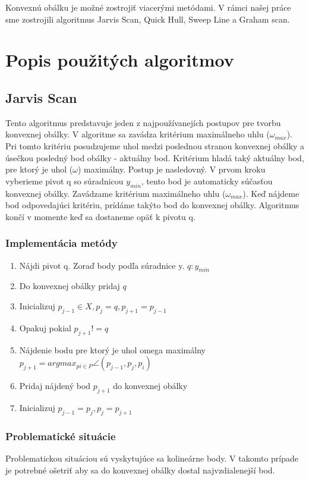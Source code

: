\documentclass[12pt]{article}
\begin{document}
Konvexnú obálku je možné zostrojiť viacerými metódami. V rámci našej práce sme zostrojili algoritmus Jarvis Scan, Quick Hull, Sweep Line a Graham scan.

\clearpage 
\section {Popis použitých algoritmov}
\subsection {Jarvis Scan}
Tento algoritmus predstavuje jeden z najpoužívanejích postupov pre tvorbu konvexnej obálky. V algoritme sa zavádza kritérium maximálneho uhlu ($\omega_{max}$). Pri tomto kritériu posudzujeme uhol medzi poslednou stranou konvexnej obálky a úsečkou posledný bod obálky - aktuálny bod. Kritérium hladá taký aktuálny bod, pre ktorý je uhol ($\omega$) maximálny. 
Postup je nasledovný. V prvom kroku vyberieme pivot q so súradnicou $y_{min}$, tento bod je automaticky súčasťou konvexnej obálky. Zavádzame kritérium maximálneho uhlu ($\omega_{max}$). Keď nájdeme bod odpovedajúci kritériu, prídáme takýto bod do konvexnej obálky. Algoritmus končí v momente keď sa dostaneme opäť k pivotu q. 

\subsubsection {Implementácia metódy}
\begin{enumerate}
\item Nájdi pivot q. Zoraď body podľa súradnice y. $ q : y_{min}$
\item Do konvexnej obálky pridaj $q$
\item Inicializuj  $p_{j-1} \in X, p_j = q, p_{j+1} = p_{j-1}$
\item Opakuj pokial $p_{j+1} != q$
\item \hspace {1.5cm} Nájdenie bodu pre ktorý je uhol omega maximálny $p_{j+1} = argmax_{pi \in P} \angle(p_{j-1}, p_j, p_i)$
\item \hspace {1.5cm} Pridaj nájdený bod  $p_{j+1}$ do konvexnej obálky
\item \hspace {1.5cm} Inicializuj $p_{j-1} = p_j , p_j = p_{j+1}$ 
\end{enumerate}

\subsubsection {Problematické situácie}
Problematickou situáciou sú vyskytujúce sa kolineárne body. V takomto prípade je potrebné ošetriť aby sa do konvexnej obálky dostal najvzdialenejší bod.
\end{document}
